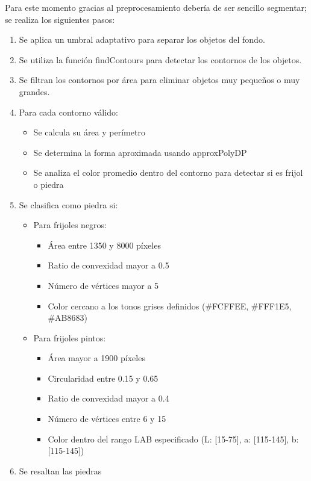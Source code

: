 \documentclass[conference]{IEEEtran}
\begin{document}
    Para este momento gracias al preprocesamiento debería de ser sencillo segmentar; se realiza los siguientes pasos:
    \begin{enumerate}
        \item Se aplica un umbral adaptativo para separar los objetos del fondo.
        \item Se utiliza la función findContours para detectar los contornos de los objetos.
        \item Se filtran los contornos por área para eliminar objetos muy pequeños o muy grandes.
        \item Para cada contorno válido:
        \begin{itemize}
            \item Se calcula su área y perímetro 
            \item Se determina la forma aproximada usando approxPolyDP
            \item Se analiza el color promedio dentro del contorno para detectar si es frijol o piedra
        \end{itemize}
        \item Se clasifica como piedra si:
        \begin{itemize}
            \item Para frijoles negros:
            \begin{itemize}
                \item Área entre 1350 y 8000 píxeles
                \item Ratio de convexidad mayor a 0.5
                \item Número de vértices mayor a 5
                \item Color cercano a los tonos grises definidos (\#FCFFEE, \#FFF1E5, \#AB8683)
            \end{itemize}
            \item Para frijoles pintos:
            \begin{itemize}
                \item Área mayor a 1900 píxeles
                \item Circularidad entre 0.15 y 0.65
                \item Ratio de convexidad mayor a 0.4
                \item Número de vértices entre 6 y 15
                \item Color dentro del rango LAB especificado (L: [15-75], a: [115-145], b: [115-145])
            \end{itemize}
        \end{itemize}
        \item Se resaltan las piedras
    \end{enumerate}
\end{document}
